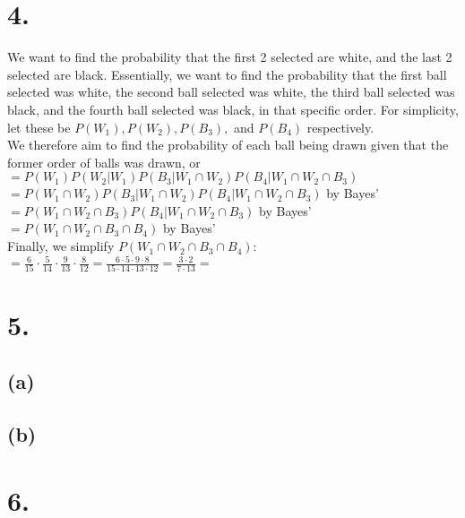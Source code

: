 \documentclass{article}
\begin{document}
\section*{4.}
{\Large 

We want to find the probability that the first 2 selected are white, and the last 2 selected are black. Essentially, we want to find the probability that the first ball selected was white, the second ball selected was white, the third ball selected was black, and the fourth ball selected was black, in that specific order. For simplicity, let these be $P(W_1), P(W_2), P(B_3), $ and $P(B_4)$ respectively. \\
We therefore aim to find the probability of each ball being drawn given that the former order of balls was drawn, or \\ 
$= P(W_1)P(W_2 | W_1)P(B_3 | W_1 \cap W_2)P(B_4 | W_1 \cap W_2 \cap B_3) $ \\
$= P(W_1 \cap W_2)P(B_3 | W_1 \cap W_2)P(B_4 | W_1 \cap W_2 \cap B_3) $ by Bayes' \\ 
$= P(W_1 \cap W_2 \cap B_3)P(B_4 | W_1 \cap W_2 \cap B_3) $ by Bayes' \\ 
$= P(W_1 \cap W_2 \cap B_3 \cap B_4)$ by Bayes' \\ 
Finally, we simplify $P(W_1 \cap W_2 \cap B_3 \cap B_4)$: \\
$=\frac{6}{15} \cdot \frac{5}{14} \cdot \frac{9}{13} \cdot \frac{8}{12} = \frac{6 \cdot 5 \cdot 9 \cdot 8}{15 \cdot 14 \cdot 13 \cdot 12} = \frac{3 \cdot 2}{7 \cdot 13} = $ 


}

\section*{5.}
{\Large 

\subsection*{(a)}

\subsection*{(b)}

}

\section*{6.}
{\Large 



}
\end{document}
